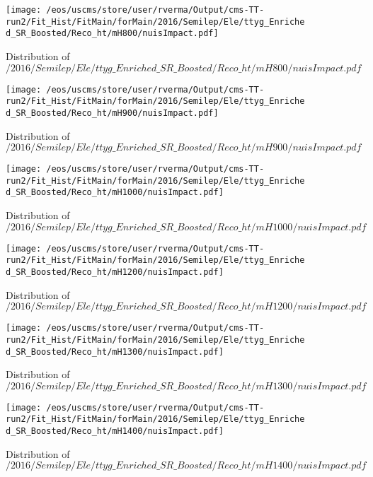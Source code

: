 \begin{figure}
\centering
\texttt{[image: /eos/uscms/store/user/rverma/Output/cms-TT-run2/Fit\_Hist/FitMain/forMain/2016/Semilep/Ele/ttyg\_Enriched\_SR\_Boosted/Reco\_ht/mH800/nuisImpact.pdf]}
\caption{Distribution of $/2016/Semilep/Ele/ttyg\_Enriched\_SR\_Boosted/Reco\_ht/mH800/nuisImpact.pdf$}
\end{figure}

\begin{figure}
\centering
\texttt{[image: /eos/uscms/store/user/rverma/Output/cms-TT-run2/Fit\_Hist/FitMain/forMain/2016/Semilep/Ele/ttyg\_Enriched\_SR\_Boosted/Reco\_ht/mH900/nuisImpact.pdf]}
\caption{Distribution of $/2016/Semilep/Ele/ttyg\_Enriched\_SR\_Boosted/Reco\_ht/mH900/nuisImpact.pdf$}
\end{figure}

\begin{figure}
\centering
\texttt{[image: /eos/uscms/store/user/rverma/Output/cms-TT-run2/Fit\_Hist/FitMain/forMain/2016/Semilep/Ele/ttyg\_Enriched\_SR\_Boosted/Reco\_ht/mH1000/nuisImpact.pdf]}
\caption{Distribution of $/2016/Semilep/Ele/ttyg\_Enriched\_SR\_Boosted/Reco\_ht/mH1000/nuisImpact.pdf$}
\end{figure}

\begin{figure}
\centering
\texttt{[image: /eos/uscms/store/user/rverma/Output/cms-TT-run2/Fit\_Hist/FitMain/forMain/2016/Semilep/Ele/ttyg\_Enriched\_SR\_Boosted/Reco\_ht/mH1200/nuisImpact.pdf]}
\caption{Distribution of $/2016/Semilep/Ele/ttyg\_Enriched\_SR\_Boosted/Reco\_ht/mH1200/nuisImpact.pdf$}
\end{figure}

\begin{figure}
\centering
\texttt{[image: /eos/uscms/store/user/rverma/Output/cms-TT-run2/Fit\_Hist/FitMain/forMain/2016/Semilep/Ele/ttyg\_Enriched\_SR\_Boosted/Reco\_ht/mH1300/nuisImpact.pdf]}
\caption{Distribution of $/2016/Semilep/Ele/ttyg\_Enriched\_SR\_Boosted/Reco\_ht/mH1300/nuisImpact.pdf$}
\end{figure}

\begin{figure}
\centering
\texttt{[image: /eos/uscms/store/user/rverma/Output/cms-TT-run2/Fit\_Hist/FitMain/forMain/2016/Semilep/Ele/ttyg\_Enriched\_SR\_Boosted/Reco\_ht/mH1400/nuisImpact.pdf]}
\caption{Distribution of $/2016/Semilep/Ele/ttyg\_Enriched\_SR\_Boosted/Reco\_ht/mH1400/nuisImpact.pdf$}
\end{figure}

